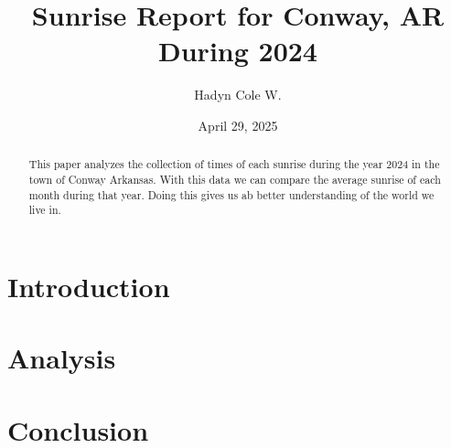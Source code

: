 \documentclass[11pt]{article}
\author{Hadyn Cole W.}
\title{Sunrise Report for Conway, AR During 2024}
\date{April 29, 2025}
\begin{document}
\maketitle

\begin{abstract}
This paper analyzes the collection of times of each sunrise during the year 2024 in the town of Conway Arkansas.
With this data we can compare the average sunrise of each month during that year.
Doing this gives us ab better understanding of the world we live in. 
\end{abstract}

\section{Introduction}


\section{Analysis}


\section{Conclusion}




\printbibliography
\end{document}
